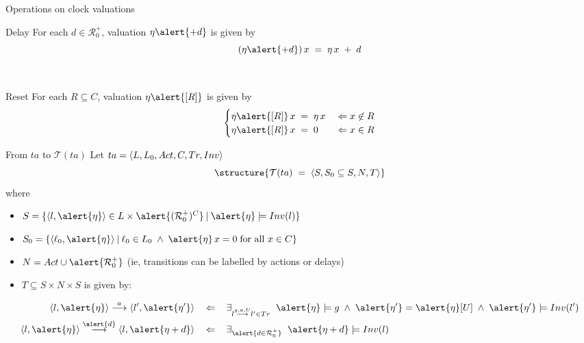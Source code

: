 \documentclass[aspectratio=169]{beamer}
\def\R{\mathcal{R}}
\def\TL#1{\mathcal{T}(#1)}
\def\tran#1{\stackrel{#1}{\longrightarrow}}
\begin{document}
\begin{slide}{Operations on clock valuations}
\small


\begin{block}{Delay}
For each $d \in \R_0^+$, valuation $\eta \alert{+ d}$ is given by
\begin{equation*}
(\eta \alert{+ d})\, x\; =\; \eta\, x\; +\; d
\end{equation*}
\end{block}
~\\

\begin{block}{Reset}
For each $R \subseteq C$, valuation $\eta\alert{[R]}$ is given by
\begin{equation*}
\begin{cases}
\eta\alert{[R]}\, x\; =\; \eta\, x & \; \rimp\; x \not\in R\\
\eta\alert{[R]}\, x\; =\; 0 & \; \rimp\; x \in R
\end{cases}
\end{equation*}
\end{block}
\end{slide}

\begin{slide}{From $ta$ to $\TL{ta}$}
\small
Let $ta = \langle L, L_0, Act, C, Tr, Inv \rangle$
\begin{equation*}
 \structure{\TL{ta}\; =\; \pair{S, S_0 \subseteq S, N, T}}
\end{equation*}
where
\begin{itemize}
\item $S = \setdef{\pair{l,\alert{\eta}} \in  L \times \alert{(\R_0^+)^C}}{\alert{\eta} \models Inv(l)}$
\item $S_0 = \setdef{\pair{\ell_0,\alert{\eta}}}{\ell_0 \in L_0\; \land\;  \alert{\eta}\, x = 0\; \text{for all $x \in C$}}$
\item $N = Act \cup \alert{\R_0^+}$ (ie, \alert{transitions can be labelled by actions or delays})
\item $T \subseteq S \times N \times S$ is given by:
\end{itemize}
\begin{align*}
\pair{l,\alert{\eta}} \tran{a} \pair{l',\alert{\eta'}}\; & ~~\rimp~~\; 
\exists_{l \tran{g,a,U} l' \in Tr}  \; \;\alert{\eta} \models g \; \land\; \alert{\eta'} = \alert{\eta}[U] \; \land\;  \alert{\eta'} \models Inv(l')\\
\pair{l,\alert{\eta}} \tran{\alert{d}} \pair{l,\alert{\eta +d}}\; & ~~\rimp~~\; 
\exists_{\alert{d \in \R_0^+}}  \; \;  \alert{\eta + d} \models Inv(l)
\end{align*}
\end{slide}
\end{document}
